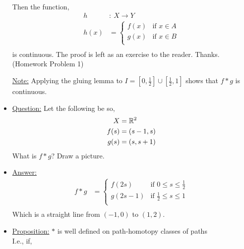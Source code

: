 \begin{itemize}
\begin{theorem}
\begin{minipage}[c]{\linewidth}
\begin{center}
                            \end{center}
                        \end{minipage}\\ 
                    Then the function,\\
            \begin{align*}
                h&:\ X\rightarrow Y\\
                h(x)&=\begin{cases}
                    f(x) & \text{if } x\in A\\
                    g(x) & \text{if } x\in B\\
                \end{cases}\\
            \end{align*}
            is continuous. The proof is left as an exercise to the reader. Thanks. (Homework Problem 1)\\
        \end{theorem}
            \underline{Note:} Applying the gluing lemma to $I = [0,\frac{1}{2}]\cup [\frac{1}{2}, 1]$ shows
            that $f*g$ is continuous.
        \item \underline{Question:} Let the following be so,
            \begin{align*}
                X &= \mathbb{R}^2\\
                f(s)&=(s-1,s)\\
                g(s)&=(s,s+1)\\
            \end{align*}
            What is $f*g$? Draw a picture.
        \item \underline{Answer:} 
            \begin{align*}
                f*g &= \begin{cases}
                    f(2s) & \text{if }0\leq s \le \frac{1}{2}\\
                    g(2s-1) & \text{if }\frac{1}{2}\leq s \le 1\\
                \end{cases}\\
            \end{align*}
            Which is a straight line from $(-1,0)$ to $(1,2)$.
        \item \underline{Proposition:} $*$ is well defined on path-homotopy classes of paths\\
            I.e., if,
            \begin{align*}

\end{align*}
\end{itemize}
